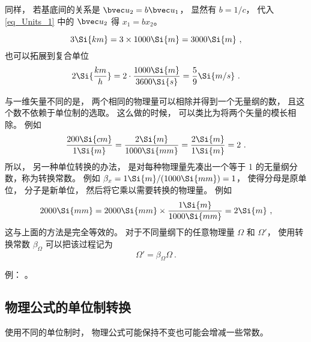 同样， 若基底间的关系是 $\bvec u_2 = b\bvec u_1$， 显然有 $b = 1/c$， 代入\autoref{eq_Units_1} 中的 $\bvec u_2$ 得 $x_1 = b x_2$。

\begin{example}{}
\begin{equation}
3 \Si{km} = 3\times 1000\Si{m} = 3000\Si{m}~,
\end{equation}
也可以拓展到复合单位
\begin{equation}
2 \Si{\frac{km}{h}} = 2\cdot \frac{1000 \Si{m}}{3600 \Si{s}} = \frac{5}{9}\Si{m/s}~.
\end{equation}
\end{example}

与一维矢量不同的是， 两个相同的物理量可以相除并得到一个无量纲的数， 且这个数不依赖于单位制的选取。 这么做的时候， 可以类比为将两个矢量的模长相除。 例如
\begin{equation}
\frac{200\Si{cm}}{1\Si{m}} = \frac{2\Si{m}}{1000\Si{mm}} = \frac{2\Si{m}}{1\Si{m}} = 2~.
\end{equation}
所以， 另一种单位转换的办法， 是对每种物理量先凑出一个等于 1 的无量纲分数，称为转换常数。 例如 $\beta_x = 1\Si{m}/(1000\Si{mm}) = 1$， 使得分母是原单位， 分子是新单位， 然后将它乘以需要转换的物理量。 例如
\begin{equation}
2000\Si{mm} = 2000\Si{mm} \times \frac{1\Si{m}}{1000\Si{mm}} = 2\Si{m}~,
\end{equation}
这与上面的方法是完全等效的。 对于不同量纲下的任意物理量 $\Omega$ 和 $\Omega'$， 使用转换常数 $\beta_\Omega$ 可以把该过程记为
\begin{equation}
\Omega' = \beta_\Omega \Omega~.
\end{equation}

例： 。

\subsection{物理公式的单位制转换}
使用不同的单位制时， 物理公式可能保持不变也可能会增减一些常数。

